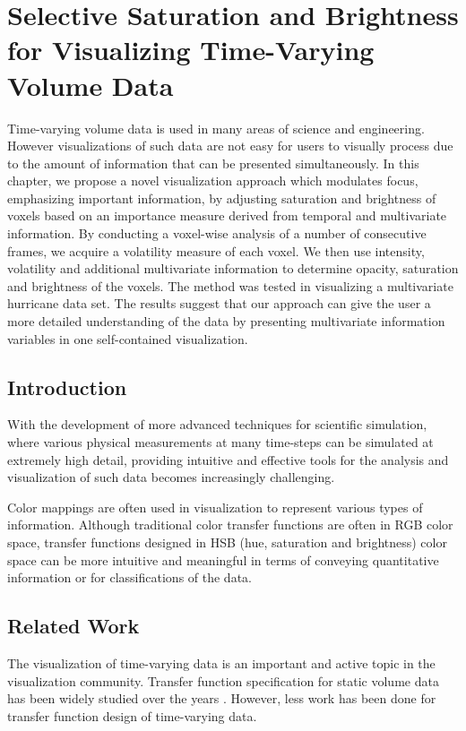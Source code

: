\chapter{Selective Saturation and Brightness for Visualizing Time-Varying Volume Data \label{selective_saturation_brightness}}
Time-varying volume data is used in many areas of science and engineering. However visualizations of such data are not easy for users to visually process due to the amount of information that can be presented simultaneously. In this chapter, we propose a novel visualization approach which modulates focus, emphasizing important information, by adjusting saturation and brightness of voxels based on an importance measure derived from temporal and multivariate information. By conducting a voxel-wise analysis of a number of consecutive frames, we acquire a volatility measure of each voxel. We then use intensity, volatility and additional multivariate information to determine opacity, saturation and brightness of the voxels. The method was tested in visualizing a multivariate hurricane data set. The results suggest that our approach can give the user a more detailed understanding of the data by presenting multivariate information variables in one self-contained visualization.

\section{Introduction}
With the development of more advanced techniques for scientific simulation, where various physical measurements at many time-steps can be simulated at extremely high detail, providing intuitive and effective tools for the analysis and visualization of such data becomes increasingly challenging.

Color mappings are often used in visualization to represent various types of information. Although traditional color transfer functions are often in RGB color space, transfer functions designed in HSB (hue, saturation and brightness) color space can be more intuitive and meaningful in terms of conveying quantitative information or for classifications of the data.
\section{Related Work}
The visualization of time-varying data is an important and active topic in the visualization community. Transfer function specification for static volume data has been widely studied over the years \cite{pfister_transfer_2001}. However, less work has been done for transfer function design of time-varying data.

